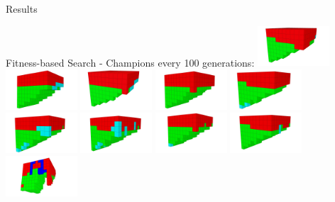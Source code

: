 \documentclass{beamer}
\begin{document}
\begin{frame}[allowframebreaks]{Results}
\begin{minipage}{\textwidth}
\begin{block}{Fitness-based Search - Champions every 100 generations:}
\includegraphics[width=0.2\textwidth]{figures/Robots/f_4_g_100.jpg}
\includegraphics[width=0.2\textwidth]{figures/Robots/f_4_g_200.jpg}
\includegraphics[width=0.2\textwidth]{figures/Robots/f_4_g_300.jpg}
\includegraphics[width=0.2\textwidth]{figures/Robots/f_4_g_400.jpg}
\includegraphics[width=0.2\textwidth]{figures/Robots/f_4_g_500.jpg}\\
\includegraphics[width=0.2\textwidth]{figures/Robots/f_4_g_600.jpg}
\includegraphics[width=0.2\textwidth]{figures/Robots/f_4_g_700.jpg}
\includegraphics[width=0.2\textwidth]{figures/Robots/f_4_g_800.jpg}
\includegraphics[width=0.2\textwidth]{figures/Robots/f_4_g_900.jpg}
\includegraphics[width=0.2\textwidth]{figures/Robots/f_4_g_1000.jpg}
\end{block}
\end{minipage}


\end{frame}
\end{document}
